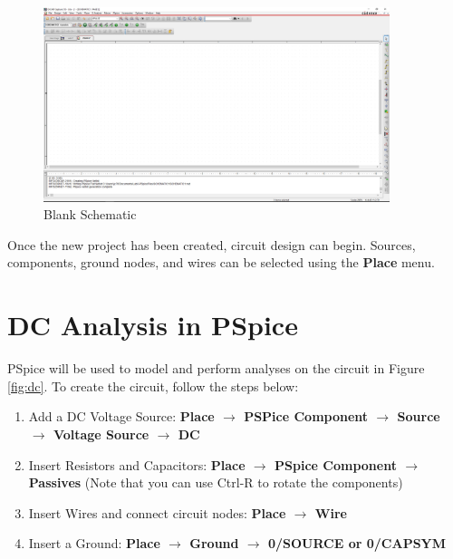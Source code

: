 \documentclass[12pt]{../manual}
\begin{document}
\begin{figure}[ht!]
	\begin{center}
		\includegraphics[width=0.9\textwidth]{./figures/BlankSchematic.PNG}
	\end{center}
	\caption{Blank Schematic}
	\label{fig:blankSchematic}
\end{figure}

Once the new project has been created, circuit design can begin. Sources, components, ground nodes, and wires can be selected using the {\bf Place} menu.

%
\newpage
\section{DC Analysis in PSpice}

PSpice will be used to model and perform analyses on the circuit in Figure \ref{fig:dc}. To create the circuit, follow the steps below:
\begin{enumerate}
	\item Add a DC Voltage Source: \textbf{Place $\to$ PSPice Component $\to$ Source $\to$ Voltage Source $\to$ DC}
	\item Insert Resistors and Capacitors: \textbf{Place $\to$ PSpice Component $\to$ Passives} (Note that you can use Ctrl-R to rotate the components) 
	\item Insert Wires and connect circuit nodes: \textbf{Place $\to$ Wire}
	\item Insert a Ground: \textbf{Place $\to$ Ground $\to$ 0/SOURCE or 0/CAPSYM}
\end{enumerate}
\end{document}
